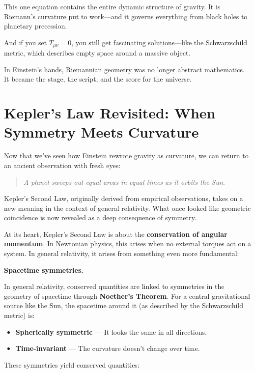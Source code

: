 This one equation contains the entire dynamic structure of gravity. It is Riemann’s curvature put to work—and it governs everything from black holes to planetary precession.

And if you set \( T_{\mu\nu} = 0 \), you still get fascinating solutions—like the Schwarzschild metric, which describes empty space around a massive object.

In Einstein’s hands, Riemannian geometry was no longer abstract mathematics. It became the stage, the script, and the score for the universe.

\section{Kepler’s Law Revisited: When Symmetry Meets Curvature}

Now that we’ve seen how Einstein rewrote gravity as curvature, we can return to an ancient observation with fresh eyes:

\begin{quote}
\textit{A planet sweeps out equal areas in equal times as it orbits the Sun.}
\end{quote}

Kepler’s Second Law, originally derived from empirical observations, takes on a new meaning in the context of general relativity. What once looked like geometric coincidence is now revealed as a deep consequence of symmetry.

At its heart, Kepler’s Second Law is about the \textbf{conservation of angular momentum}. In Newtonian physics, this arises when no external torques act on a system. In general relativity, it arises from something even more fundamental:

\textbf{Spacetime symmetries.}

In general relativity, conserved quantities are linked to symmetries in the geometry of spacetime through \textbf{Noether’s Theorem}. For a central gravitational source like the Sun, the spacetime around it (as described by the Schwarzschild metric) is:

\begin{itemize}
  \item \textbf{Spherically symmetric} — It looks the same in all directions.
  \item \textbf{Time-invariant} — The curvature doesn't change over time.
\end{itemize}

These symmetries yield conserved quantities:

